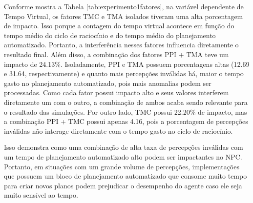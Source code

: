 Conforme mostra a Tabela \ref{tab:experimento1fatores}, na variável dependente de Tempo Virtual, os fatores TMC e TMA isolados tiveram uma alta porcentagem de impacto. Isso porque a contagem do tempo virtual acontece em função do tempo médio do ciclo de raciocínio e do tempo médio do planejamento automatizado. Portanto, a interferência nesses fatores influencia diretamente o resultado final. Além disso, a combinação dos fatores PPI + TMA teve um impacto de 24.13\%. Isoladamente, PPI e TMA possuem porcentagens altas (12.69 e 31.64, respectivamente) e quanto mais percepções inválidas há, maior o tempo gasto no planejamento automatizado, pois mais anomalias podem ser processadas. Como cada fator possui impacto alto e seus valores interferem diretamente um com o outro, a combinação de ambos acaba sendo relevante para o resultado das simulações. Por outro lado, TMC possui 22.20\% de impacto, mas a combinação PPI + TMC possui apenas 4.16, pois a porcentagem de percepções inválidas não interage diretamente com o tempo gasto no ciclo de raciocínio.

Isso demonstra como uma combinação de alta taxa de percepções inválidas com um tempo de planejamento automatizado alto podem ser impactantes no NPC. Portanto, em situações com um grande volume de percepções, implementações que possuem um bloco de planejamento automatizado que consome muito tempo para criar novos planos podem prejudicar o desempenho do agente caso ele seja muito sensível ao tempo.

